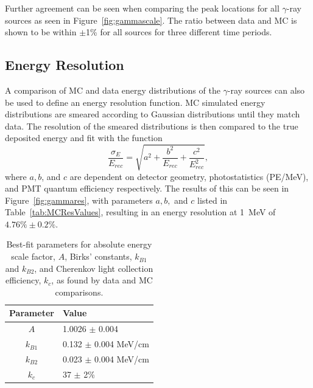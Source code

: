 Further agreement can be seen when comparing the peak locations for all $\gamma$-ray sources as seen in Figure~\ref{fig:gammascale}. The ratio between data and MC is shown to be within $\pm$1\% for all sources for three different time periods.

\subsection{Energy Resolution}

A comparison of MC and data energy distributions of the $\gamma$-ray sources can also be used to define an energy resolution function. 
MC simulated energy distributions are smeared according to Gaussian distributions until they match data. 
The resolution of the smeared distributions is then compared to the true deposited energy and fit with the function
\begin{equation}
	\frac{\sigma_E}{E_{rec}} = \sqrt{a^2 + \frac{b^2}{E_{rec}} + \frac{c^2}{E^2_{rec}}},
	\label{eq:ERes}
\end{equation}
where $a, b$, and $c$ are dependent on detector geometry, photostatistics (PE/MeV), and PMT quantum efficiency respectively. 
The results of this can be seen in Figure~\ref{fig:gammares}, with parameters $a, b,$ and $c$ listed in Table~\ref{tab:MCResValues}, resulting in an energy resolution at 1~MeV of $4.76\%\pm0.2\%$.

\newpage

\begin{table}[H]
	\centering
	\begin{tabular}{c|l}
		\hline 
		\textbf{Parameter} & \textbf{Value} \\ 
		\hline 
		$A$ & 1.0026 $\pm$ 0.004 \\ 
		$k_{B1}$ & 0.132 $\pm$ 0.004 MeV/cm \\ 
		$k_{B2}$ & 0.023 $\pm$ 0.004 MeV/cm \\ 
		$k_c$ & 37 $\pm$ 2\% \\ 
		\hline 
	\end{tabular} 
	\caption{Best-fit parameters for absolute energy scale factor, $A$, Birks' constants, $k_{B1}$ and $k_{B2}$, and Cherenkov light collection efficiency, $k_c$, as found by data and MC comparisons.}
	\label{tab:MCValues}
\end{table}

